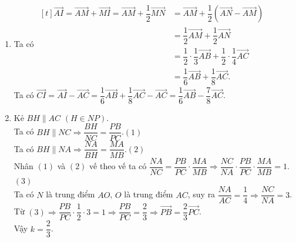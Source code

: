\begin{bt}
{\begin{enumerate}
\begin{itemize}
					Vì $N$ là trung điểm của $AO
					\Rightarrow\left|\overrightarrow{AN}\right|=AN=\dfrac{AO}{2}=\dfrac{a\sqrt{3}}{2}$.
					\item $
						\overrightarrow{AM}\cdot\overrightarrow{AN}=AM\cdot AN\cdot \cos\left(\overrightarrow{AM};\overrightarrow{AN}\right)
						=\dfrac{2a}{3}\cdot\dfrac{a\sqrt{3}}{2}\cdot\cos30^\circ
						=\dfrac{a^2}{2}.
					$
				\end{itemize} 
			\item Ta có $\begin{aligned}[t]
				\overrightarrow{AI}=\overrightarrow{AM}+\overrightarrow{MI}=\overrightarrow{AM}+\dfrac{1}{2}\overrightarrow{MN}
				&=\overrightarrow{AM}+\dfrac{1}{2}\left(\overrightarrow{AN}-\overrightarrow{AM}\right)\\
				&=\dfrac{1}{2}\overrightarrow{AM}+\dfrac{1}{2}\overrightarrow{AN}\\
				&=\dfrac{1}{2}\cdot\dfrac{1}{3}\overrightarrow{AB}+\dfrac{1}{2}\cdot\dfrac{1}{4}\overrightarrow{AC}\\
				&=\dfrac{1}{6}\overrightarrow{AB}+\dfrac{1}{8}\overrightarrow{AC}.
			\end{aligned}$\\
			Ta có $
				\overrightarrow{CI}=\overrightarrow{AI}-\overrightarrow{AC}=\dfrac{1}{6}\overrightarrow{AB}+\dfrac{1}{8}\overrightarrow{AC}-\overrightarrow{AC}=\dfrac{1}{6}\overrightarrow{AB}-\dfrac{7}{8}\overrightarrow{AC}
			$.
			\item Kẻ $BH\parallel AC$ $(H\in NP)$.\\
			Ta có $BH\parallel NC\Rightarrow\dfrac{BH}{NC}=\dfrac{PB}{PC}$.\hfill$(1)$\\
			Ta có $BH\parallel NA\Rightarrow\dfrac{NA}{BH}=\dfrac{MA}{MB}$.\hfill$(2)$\\
			Nhân $(1)$ và $(2)$ vế theo vế ta có $\dfrac{NA}{NC}=\dfrac{PB}{PC}\cdot\dfrac{MA}{MB}\Rightarrow\dfrac{NC}{NA}\cdot\dfrac{PB}{PC}\cdot\dfrac{MA}{MB}=1$.\hfill$(3)$\\
			Ta có $N$ là trung điểm $AO$, $O$ là trung điểm $AC$, suy ra $\dfrac{NA}{AC}=\dfrac{1}{4}\Rightarrow\dfrac{NC}{NA}=3$.\\
			Từ $(3)\Rightarrow\dfrac{PB}{PC}\cdot\dfrac{1}{2}\cdot3=1\Rightarrow\dfrac{PB}{PC}=\dfrac{2}{3}\Rightarrow\overrightarrow{PB}=\dfrac{2}{3}\overrightarrow{PC}$.\\
			Vậy $k=\dfrac{2}{3}$.
			\end{enumerate}	
}
\end{bt}

